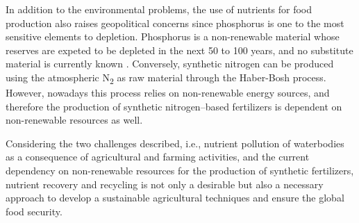 \begin{refsection}[referencesCh1]
In addition to the environmental problems, the use of nutrients for food production also raises geopolitical concerns since phosphorus is one to the most sensitive elements to depletion. Phosphorus is a non-renewable material whose reserves are expeted to be depleted in the next 50 to 100 years, and no substitute material is currently known \citep{cordell2009story}. Conversely, synthetic nitrogen can be produced using the atmospheric N\textsubscript{2} as raw material through the Haber-Bosh process. However, nowadays this process relies on non-renewable energy sources, and therefore the production of synthetic nitrogen--based fertilizers is dependent on non-renewable resources as well.

Considering the two challenges described, i.e., nutrient pollution of waterbodies as a consequence of agricultural and farming activities, and the current dependency on non-renewable resources for the production of synthetic fertilizers, nutrient recovery and recycling is not only a desirable but also a necessary approach to develop a sustainable agricultural techniques and ensure the global food security.


\end{refsection}
